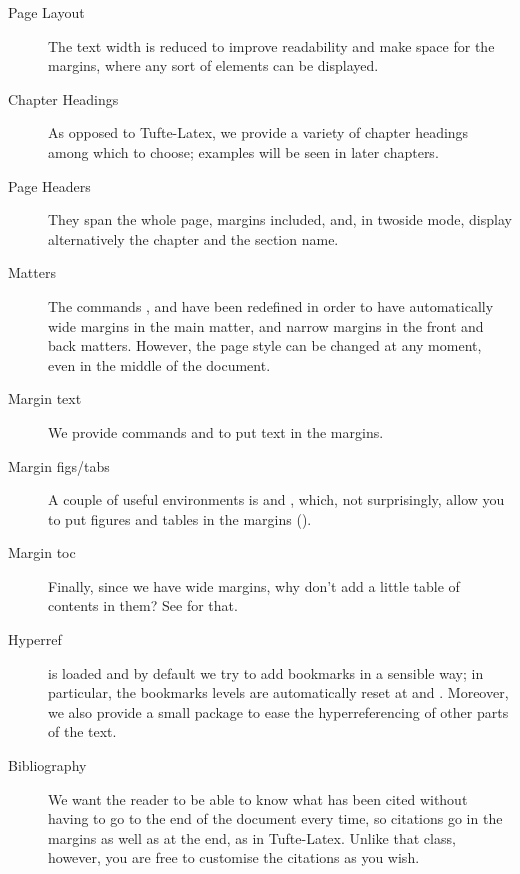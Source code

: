 \begin{description}
    \item[Page Layout] The text width is reduced to improve readability 
    and make space for the margins, where any sort of elements can be 
    displayed.
    \item[Chapter Headings] As opposed to Tufte-Latex, we provide a 
    variety of chapter headings among which to choose; examples will be 
    seen in later chapters.
    \item[Page Headers] They span the whole page, margins included, and, 
    in twoside mode, display alternatively the chapter and the section 
    name.
    \item[Matters] The commands , 
     and  have been redefined in 
    order to have automatically wide margins in the main matter, and 
    narrow margins in the front and back matters. However, the page 
    style can be changed at any moment, even in the middle of the 
    document.
    \item[Margin text] We provide commands  and 
     to put text in the 
    margins.
    \item[Margin figs/tabs] A couple of useful environments is 
     and , which, not 
    surprisingly, allow you to put figures and tables in the margins 
    (\cfr {}).
    \item[Margin toc] Finally, since we have wide margins, why don't add 
    a little table of contents in them? See  for 
    that.
    \item[Hyperref]  is loaded and by default we try 
    to add bookmarks in a sensible way; in particular, the bookmarks 
    levels are automatically reset at  and 
    . Moreover, we also provide a small package to 
    ease the hyperreferencing of other parts of the text.
    \item[Bibliography] We want the reader to be able to know what has 
    been cited without having to go to the end of the document every 
    time, so citations go in the margins as well as at the end, as in 
    Tufte-Latex. Unlike that class, however, you are free to customise 
    the citations as you wish.
\end{description}

